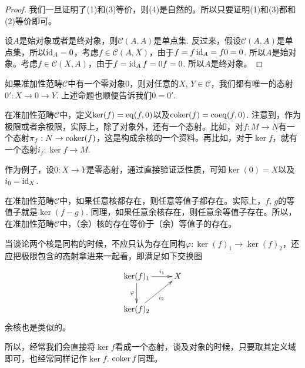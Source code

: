 \begin{proof}
我们一旦证明了(1)和(3)等价，则(4)是自然的。所以只要证明(1)和(3)都和(2)等价即可。

设$A$是始对象或者是终对象，则$\mathcal{C}(A,A)$是单点集. 反过来，假设$\mathcal{C}(A,A)$是单点集，所以$\operatorname{id}_A=0$，考虑$f\in \mathcal{C}(A,X)$，由于$f=f\operatorname{id}_A=f0=0$. 所以$A$是始对象。考虑$f\in \mathcal{C}(X,A)$，由于$f=\operatorname{id}_A f=0f=0$. 所以$A$是终对象。
\end{proof}

如果准加性范畴$\mathcal{C}$中有一个零对象$0$，则对任意的$X$, $Y\in\mathcal{C}$，我们都有唯一的态射$0': X\to 0 \to Y$. 上述命题也顺便告诉我们$0=0'$. 

\begin{para}
在准加性范畴$\mathcal{C}$中，定义$\ker(f)=\operatorname{eq}(f,0)$以及$\operatorname{coker}(f)=\mathrm{coeq}(f,0)$. 注意到，作为极限或者余极限，实际上，除了对象外，还有一个态射。比如，对$f:M\to N$有一个态射$\pi_f:N\to \operatorname{coker}(f)$，这是构成余核的一个资料。再比如，对于$\ker f$，就有一个态射$i_f:\ker f\to M$. 

作为例子，设$0:X\to Y$是零态射，通过直接验证泛性质，可知$\ker(0)=X$以及$i_0=\operatorname{id}_X$.
\end{para}

\begin{para}
在准加性范畴$\mathcal{C}$中，如果任意核都存在，则任意等值子都存在。实际上，$f$, $g$的等值子就是$\ker(f-g)$. 同理，如果任意余核存在，则任意余等值子存在。所以，在准加性范畴$\mathcal{C}$中，（余）核的存在等价于（余）等值子的存在。
\end{para}

当谈论两个核是同构的时候，不应只认为存在同构$\varphi:\ker(f)_1\to \ker(f)_2$，还应把极限包含的态射拿进来一起看，即满足如下交换图
\[
\begin{xy}
	\xymatrix{
	\ker(f)_1\ar[d]_{\varphi}\ar[r]^-{i_1} &X\\
	\ker(f)_2\ar[ru]_{i_2}
	}
\end{xy}
\]
余核也是类似的。

所以，经常我们会直接将$\ker f$看成一个态射，谈及对象的时候，只要取其定义域即可，也经常同样记作$\ker f$. $\operatorname{coker} f$同理。

